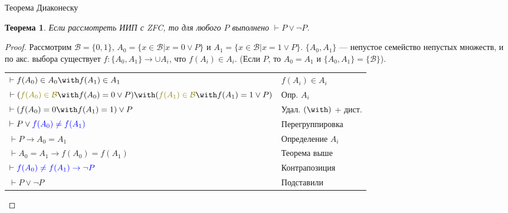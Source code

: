 \documentclass[aspectratio=169]{beamer}
\newtheorem{thm}{Теорема}[section]
\begin{document}
\begin{frame}{Теорема Диаконеску}
\begin{thm}Если рассмотреть ИИП с ZFC, то для любого $P$ выполнено $\vdash P \vee \neg P$.\end{thm}
\begin{proof}Рассмотрим $\mathcal{B} = \{0,1\}$, $A_0 = \{ x \in \mathcal{B} | x = 0 \vee P \}$ и 
$A_1 = \{ x \in \mathcal{B} | x = 1 \vee P\}$.
$\{A_0,A_1\}$ --- непустое семейство непустых множеств, и по акс. выбора существует
$f: \{A_0,A_1\} \rightarrow \cup A_i$, что $f(A_i) \in A_i$. (Если $P$, то $A_0 = A_1$ и $\{A_0,A_1\} = \{\mathcal{B}\}$).

\vspace{0.3cm}
\begin{tabular}{ll}
$\vdash f(A_0) \in A_0 \with f(A_1) \in A_1$ & $f(A_i) \in A_i$\\
$\vdash({\color{olive}f(A_0) \in \mathcal{B}} \with f(A_0) = 0 \vee P) \with ({\color{olive}f(A_1) \in \mathcal{B}} \with f(A_1) = 1 \vee P)$ & Опр. $A_i$\\
$\vdash (f(A_0) = 0 \with f(A_1) = 1) \vee P$ & Удал. $(\with)$ + дист.\\
$\vdash P\vee{\color{blue}f(A_0) \ne f(A_1)}$ & Перегруппировка\\\pause
$\vdash P \rightarrow A_0 = A_1$ & Определение $A_i$\\
$\vdash A_0 = A_1 \rightarrow f(A_0) = f(A_1)$ & Теорема выше\\
$\vdash \color{blue} f(A_0) \ne f(A_1) \rightarrow \neg P$ & Контрапозиция\\
$\vdash P \vee \neg P$ & Подставили
\end{tabular}

\end{proof}
\end{frame}
\end{document}
